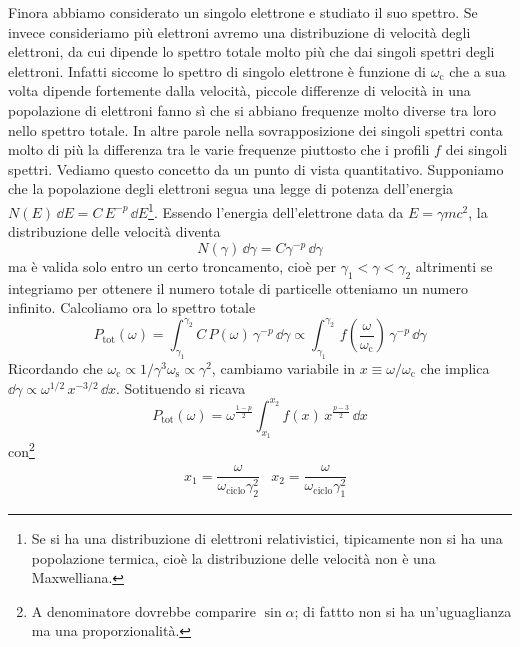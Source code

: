 Finora abbiamo considerato un singolo elettrone e studiato il suo spettro. Se invece consideriamo più elettroni avremo una distribuzione di velocità degli elettroni, da cui dipende lo spettro totale molto più che dai singoli spettri degli elettroni. Infatti siccome lo spettro di singolo elettrone è funzione di $\omega_\mathrm{c}$ che a sua volta dipende fortemente dalla velocità, piccole differenze di velocità in una popolazione di elettroni fanno sì che si abbiano frequenze molto diverse tra loro nello spettro totale. In altre parole nella sovrapposizione dei singoli spettri conta molto di più la differenza tra le varie frequenze piuttosto che i profili $f$ dei singoli spettri. Vediamo questo concetto da un punto di vista quantitativo. Supponiamo che la popolazione degli elettroni segua una legge di potenza dell'energia $N(E)\,\dd E = C \, E^{-p} \, \dd E$\footnote{Se si ha una distribuzione di elettroni relativistici, tipicamente non si ha una popolazione termica, cioè la distribuzione delle velocità non è una Maxwelliana.}. Essendo l'energia dell'elettrone data da $E=\gamma m c^2$, la distribuzione delle velocità diventa
\begin{equation}
N(\gamma)\, \dd \gamma = C \gamma^{-p} \,\dd \gamma \label{eq:Sincrotrone2}
\end{equation}
ma è valida solo entro un certo troncamento, cioè per $\gamma_1 <\gamma < \gamma_2$ altrimenti se integriamo per ottenere il numero totale di particelle otteniamo un numero infinito. Calcoliamo ora lo spettro totale
\begin{equation}
P_\mathrm{tot} (\omega) = \int_{\gamma_1}^{\gamma_2} C \, P(\omega) \, \gamma^{-p} \, \dd\gamma \propto \int_{\gamma_1}^{\gamma_2} \, f\left(\dfrac{\omega}{\omega_\mathrm{c}}\right) \, \gamma^{-p} \, \dd\gamma
\end{equation}
Ricordando che $\omega_\mathrm{c} \propto 1/\gamma^3\omega_\mathrm{s} \propto \gamma^2$, cambiamo variabile in $x\equiv \omega/\omega_\mathrm{c}$ che implica $\dd\gamma \propto \omega^{1/2} \, x^{-3/2} \, \dd x$. Sotituendo si ricava
\begin{equation}
P_\mathrm{tot} (\omega) = \omega^{\frac{1-p}{2}} \int_{x_1}^{x_2} f(x) \, x^{\frac{p-3}{2}} \, \dd x
\end{equation}
con\footnote{A denominatore dovrebbe comparire $\sin\alpha$; di fattto non si ha un'uguaglianza ma una proporzionalità.}
\begin{align}
&x_1 = \dfrac{\omega}{\omega_\mathrm{ciclo}\gamma_2^2}
&x_2 = \dfrac{\omega}{\omega_\mathrm{ciclo}\gamma_1^2}
\end{align}

